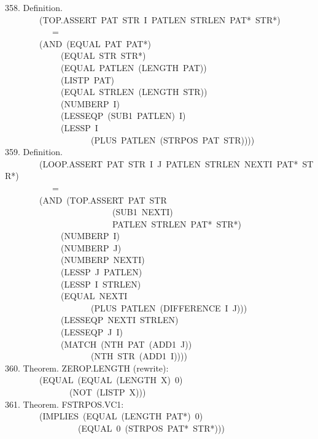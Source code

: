 \documentclass[10pt]{book}
\newenvironment{pubasis}{\begin{flushleft}}{\end{flushleft}}
\begin{document}
\begin{pubasis}
358.    Definition.\\
~~~~~~~~(TOP.ASSERT~PAT~STR~I~PATLEN~STRLEN~PAT*~STR*)\\
~~~~~~~~~~~=\\
~~~~~~~~(AND~(EQUAL~PAT~PAT*)\\
~~~~~~~~~~~~~(EQUAL~STR~STR*)\\
~~~~~~~~~~~~~(EQUAL~PATLEN~(LENGTH~PAT))\\
~~~~~~~~~~~~~(LISTP~PAT)\\
~~~~~~~~~~~~~(EQUAL~STRLEN~(LENGTH~STR))\\
~~~~~~~~~~~~~(NUMBERP~I)\\
~~~~~~~~~~~~~(LESSEQP~(SUB1~PATLEN)~I)\\
~~~~~~~~~~~~~(LESSP~I\\
~~~~~~~~~~~~~~~~~~~~(PLUS~PATLEN~(STRPOS~PAT~STR))))\\

359.    Definition.\\
~~~~~~~~(LOOP.ASSERT~PAT~STR~I~J~PATLEN~STRLEN~NEXTI~PAT*~STR*)\\
~~~~~~~~~~~=\\
~~~~~~~~(AND~(TOP.ASSERT~PAT~STR\\
~~~~~~~~~~~~~~~~~~~~~~~~~(SUB1~NEXTI)\\
~~~~~~~~~~~~~~~~~~~~~~~~~PATLEN~STRLEN~PAT*~STR*)\\
~~~~~~~~~~~~~(NUMBERP~I)\\
~~~~~~~~~~~~~(NUMBERP~J)\\
~~~~~~~~~~~~~(NUMBERP~NEXTI)\\
~~~~~~~~~~~~~(LESSP~J~PATLEN)\\
~~~~~~~~~~~~~(LESSP~I~STRLEN)\\
~~~~~~~~~~~~~(EQUAL~NEXTI\\
~~~~~~~~~~~~~~~~~~~~(PLUS~PATLEN~(DIFFERENCE~I~J)))\\
~~~~~~~~~~~~~(LESSEQP~NEXTI~STRLEN)\\
~~~~~~~~~~~~~(LESSEQP~J~I)\\
~~~~~~~~~~~~~(MATCH~(NTH~PAT~(ADD1~J))\\
~~~~~~~~~~~~~~~~~~~~(NTH~STR~(ADD1~I))))\\

360.    Theorem.  ZEROP.LENGTH (rewrite):\\
~~~~~~~~(EQUAL~(EQUAL~(LENGTH~X)~0)\\
~~~~~~~~~~~~~~~(NOT~(LISTP~X)))\\

361.    Theorem.  FSTRPOS.VC1:\\
~~~~~~~~(IMPLIES~(EQUAL~(LENGTH~PAT*)~0)\\
~~~~~~~~~~~~~~~~~(EQUAL~0~(STRPOS~PAT*~STR*)))\\


\end{pubasis}
\end{document}
